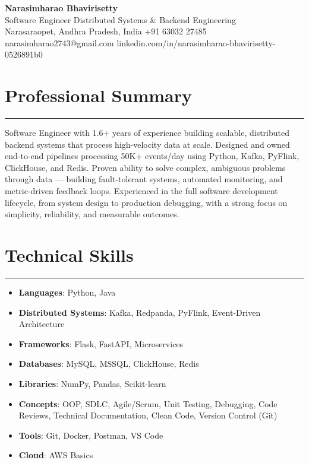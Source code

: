 \documentclass[12pt]{article}
\begin{document}
\begin{center}
  {\huge\textbf{Narasimharao Bhavirisetty}}\\[3pt]
  Software Engineer \textbullet{} Distributed Systems \& Backend Engineering \\[3pt]
  Narasaraopet, Andhra Pradesh, India \textbullet{} +91 63032 27485 \textbullet{} narasimharao2743@gmail.com \textbullet{} linkedin.com/in/narasimharao-bhavirisetty-0526891b0
\end{center}

\vspace{6pt}

\section*{Professional Summary}
\vspace{1pt}\hrule\vspace{4pt}
Software Engineer with 1.6+ years of experience building scalable, distributed backend systems that process high-velocity data at scale. Designed and owned end-to-end pipelines processing 50K+ events/day using Python, Kafka, PyFlink, ClickHouse, and Redis. Proven ability to solve complex, ambiguous problems through data — building fault-tolerant systems, automated monitoring, and metric-driven feedback loops. Experienced in the full software development lifecycle, from system design to production debugging, with a strong focus on simplicity, reliability, and measurable outcomes.

\section*{Technical Skills}
\vspace{1pt}\hrule\vspace{4pt}
\begin{itemize}
  \item \textbf{Languages}: Python, Java
  \item \textbf{Distributed Systems}: Kafka, Redpanda, PyFlink, Event-Driven Architecture
  \item \textbf{Frameworks}: Flask, FastAPI, Microservices
  \item \textbf{Databases}: MySQL, MSSQL, ClickHouse, Redis
  \item \textbf{Libraries}: NumPy, Pandas, Scikit-learn
  \item \textbf{Concepts}: OOP, SDLC, Agile/Scrum, Unit Testing, Debugging, Code Reviews, Technical Documentation, Clean Code, Version Control (Git)
  \item \textbf{Tools}: Git, Docker, Postman, VS Code
  \item \textbf{Cloud}: AWS Basics
\end{itemize}
\end{document}
